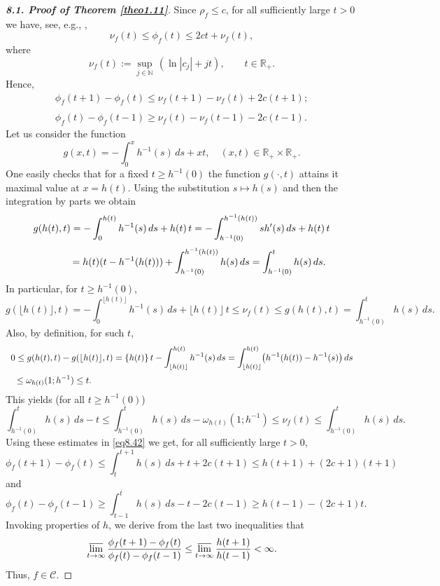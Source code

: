 \documentclass[11pt, oneside]{amsart}
\begin{document}
\begin{proof}[{\bf 8.1. Proof of Theorem \ref{theo1.11}}]
Since $\rho_f\le c$, for all sufficiently large $t>0$ we have, see, e.g., \cite[Ch.\,I.2]{L},
 \begin{equation}\label{equ8.45}
 \nu_f(t)\le\phi_f(t)\le 2c t+\nu_f(t),
 \end{equation}
 where
 \[
 \nu_f(t):=\sup_{j\in\mathbb N}\,(\ln |c_j|+jt),\qquad t\in\mathbb R_+.
 \]
 Hence,
 \begin{equation}\label{eq8.42}
 \begin{array}{lr}
 \displaystyle
 \phi_f(t+1)-\phi_f(t)\le \nu_f(t+1)-\nu_f(t)+2c(t+1);\\ \\
\displaystyle
 \phi_f(t)-\phi_f(t-1)\ge \nu_f(t)-\nu_f(t-1)-2c(t-1).
 \end{array}
 \end{equation}
 Let us consider the function
 \[
 g(x,t)=-\int_0^x h^{-1}(s)\, ds+xt,\quad (x, t)\in \mathbb R_+\times\mathbb R_+.
 \]
 One easily checks that for a fixed $t\ge h^{-1}(0)$ the function $g(\cdot, t)$ attains it maximal value at $x=h(t)$.
Using the substitution $s\mapsto h(s)$ and then the integration by parts we obtain
 \[
 \begin{array}{l}
 \displaystyle
 g(h(t),t)=
 -\int_0^{h(t)} h^{-1}(s)\, ds+h(t)\,t=-\int_{h^{-1}(0)}^{h^{-1}(h(t))} s h'(s)\, ds+h(t)\,t\medskip\\
 \displaystyle \qquad \qquad =
 h(t) (t-h^{-1}(h(t)))+\int_{h^{-1}(0)}^{h^{-1}(h(t))}h(s)\, ds=\int_{h^{-1}(0)}^{t}h(s)\,ds.
 \end{array}
 \]
  In particular, for $t\ge h^{-1}(0)$,
 \[
g(\lfloor h(t)\rfloor,t) =
-\int_0^{\lfloor h(t)\rfloor} h^{-1}(s)\, ds+\lfloor h(t)\rfloor\,t\le \nu_f(t)\le g(h(t),t)=\int_{h^{-1}(0)}^{t}h(s)\,ds.
 \]
 Also, by definition, for such $t$,
 \[
 \begin{array}{l}
 \displaystyle
0\le g(h(t),t)-g(\lfloor h(t)\rfloor,t)=\{h(t)\}\,t-\int_{\lfloor h(t)\rfloor}^{h(t)} h^{-1}(s)\,ds=\int_{\lfloor h(t)\rfloor}^{h(t)} \bigl(h^{-1}(h(t))-h^{-1}(s)\bigr)\,ds\medskip\\
 \displaystyle \ \ \le \omega_{h(t)}(1;h^{-1}) \le t.\end{array}
 \]
This yields (for all $t\ge h^{-1}(0)$)
\begin{equation}\label{eq8.43}
\int_{h^{-1}(0)}^{t}h(s)\,ds- t\le \int_{h^{-1}(0)}^{t}h(s)\,ds-\omega_{h(t)}(1;h^{-1})\le
\nu_f(t)\le \int_{h^{-1}(0)}^{t}h(s)\,ds.
\end{equation}
Using these estimates in \eqref{eq8.42} we get, for all sufficiently large $t>0$,
\begin{equation}\label{equ8.48}
\phi_f(t+1)-\phi_f(t)\le \int_t^{t+1}h(s)\, ds+t+2c (t+1)\le h(t+1)+(2c+1)(t+1)
\end{equation}
and
\begin{equation}\label{equ8.49}
\phi_f(t)-\phi_f(t-1)\ge \int_{t-1}^t h(s)\, ds- t-2c(t-1)\ge h(t-1)- (2c+1)t.
\end{equation} 
Invoking properties of $h$, we derive from the last two inequalities that
\[
\varlimsup_{t\rightarrow\infty}\frac{\phi_f(t+1)-\phi_f(t)}{\phi_f(t)-\phi_f(t-1)}\le\varlimsup_{t\rightarrow\infty}\frac{h(t+1)}{h(t-1)}<\infty.
\]
Thus, $f\in\mathscr C$. 


\end{proof}
\end{document}

